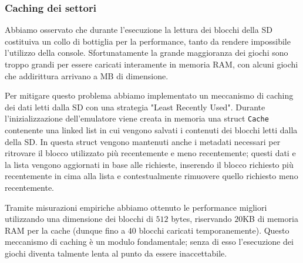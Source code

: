 \documentclass[hidelinks,12pt]{article}
\begin{document}
\subsubsection{Caching dei settori}
Abbiamo osservato che durante l'esecuzione la lettura dei blocchi della SD
costituiva un collo di bottiglia per la performance, tanto da rendere
impossibile l'utilizzo della console. Sfortunatamente la grande maggioranza
dei giochi sono troppo grandi per essere caricati interamente in memoria RAM,
con alcuni giochi che addirittura arrivano a MB di dimensione.

Per mitigare questo problema abbiamo implementato un meccanismo di caching dei
dati letti dalla SD con una strategia "Least Recently Used".
Durante l'inizializzazione dell'emulatore viene creata in memoria una struct
\texttt{Cache} contenente una linked list in cui vengono salvati i contenuti
dei blocchi letti dalla della SD.
In questa struct vengono mantenuti anche i metadati necessari per
ritrovare il blocco utilizzato più recentemente e meno recentemente; questi dati
e la lista vengono aggiornati in base alle richieste, inserendo il blocco
richiesto più recentemente in cima alla lista e contestualmente rimuovere quello
richiesto meno recentemente.

Tramite misurazioni empiriche abbiamo ottenuto le performance migliori
utilizzando una dimensione dei blocchi di $512$ bytes, riservando $20$KB di
memoria RAM per la cache (dunque fino a $40$ blocchi caricati temporanemente).
Questo meccanismo di caching è un modulo fondamentale; senza di esso l'esecuzione
dei giochi diventa talmente lenta al punto da essere inaccettabile.

\end{document}
